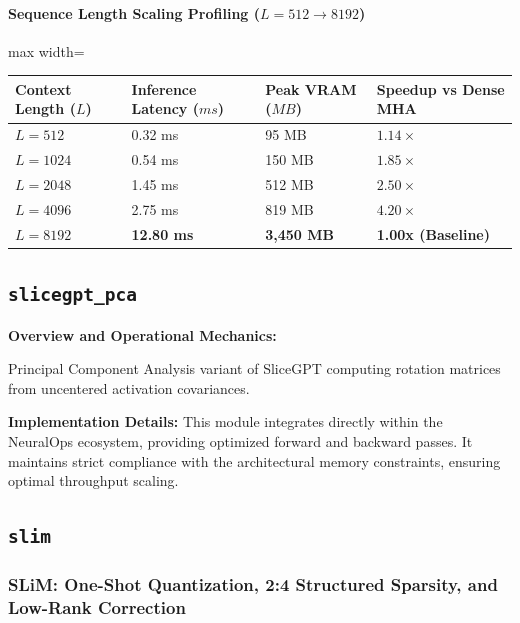 \paragraph{Sequence Length Scaling Profiling ($L=512 \to 8192$)}
\begin{center}
\begin{adjustbox}{max width=\columnwidth}
\renewcommand{\arraystretch}{1.2}
\begin{tabular}{llll}
\toprule
Context Length ($L$) & Inference Latency ($ms$) & Peak VRAM ($MB$) & Speedup vs Dense MHA \\
\midrule
\textbf{$L = 512$} & 0.32 ms & 95 MB & $1.14\times$ \\
\textbf{$L = 1024$} & 0.54 ms & 150 MB & $1.85\times$ \\
\textbf{$L = 2048$} & 1.45 ms & 512 MB & $2.50\times$ \\
\textbf{$L = 4096$} & 2.75 ms & 819 MB & $4.20\times$ \\
\textbf{$L = 8192$} & \textbf{12.80 ms} & \textbf{3,450 MB} & \textbf{1.00x (Baseline)} \\


\bottomrule
\end{tabular}
\end{adjustbox}
\end{center}

\subsection{\texttt{slicegpt\_pca}}
\textbf{Overview and Operational Mechanics:}

Principal Component Analysis variant of SliceGPT computing rotation matrices from uncentered activation covariances.

\textbf{Implementation Details:}
This module integrates directly within the NeuralOps ecosystem, providing optimized forward and backward passes. It maintains strict compliance with the architectural memory constraints, ensuring optimal throughput scaling.

\subsection{\texttt{slim}}
\subsubsection*{SLiM: One-Shot Quantization, 2:4 Structured Sparsity, and Low-Rank Correction}

